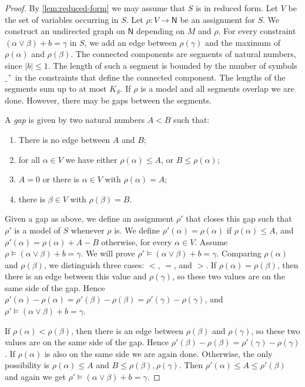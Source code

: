 \documentclass[11pt,a4paper]{article}
\def\NN{\mathsf{N}}
\begin{document}
\begin{proof}
By \cref{lem:reduced-form} we may assume that $S$ is in reduced form.
Let $V$ be the set of variables occurring in $S$.
Let $\rho: V\to\NN$ be an assignment for $S$.
We construct an undirected graph on $\NN$ depending on $M$ and $\rho$.
For every constraint  $(\alpha\vee\beta)+b = \gamma$ in $S$,
we add an edge between $\rho(\gamma)$ and the maximum of $\rho(\alpha)$ and $\rho(\beta)$. 
The connected components are segments of natural numbers, since $|b|\leq 1$.
The length of such a segment is bounded by the number of symbols $\_^+$
in the constraints that define the connected component.
The lengths of the segments sum up to at most $K_{S}$.
If $\rho$ is a model and all segments overlap we are done.
However, there may be gaps between the segments.

A \emph{gap} is given by two natural numbers $A<B$ such that:
\begin{enumerate}
\item There is no edge between $A$ and $B$;
\item for all $\alpha\in V$ we have either $\rho(\alpha)\leq A$, or $B\leq\rho(\alpha)$; 
\item $A=0$ or there is $\alpha\in V$ with $\rho(\alpha)=A$;
\item there is $\beta\in V$ with $\rho(\beta)=B$.
\end{enumerate}

Given a gap as above, we define an assignment $\rho'$ that closes this gap
such that $\rho'$ is a model of $S$ whenever $\rho$ is. We define
$\rho'(\alpha) = \rho(\alpha)$ if $\rho(\alpha)\leq A$,
and $\rho'(\alpha) = \rho(\alpha)+A-B$ otherwise, for every $\alpha\in V$.
Assume $\rho\models (\alpha\vee\beta)+b = \gamma$.
We will prove $\rho'\models (\alpha\vee\beta)+b = \gamma$.
Comparing $\rho(\alpha)$ and $\rho(\beta)$, we distinguish three cases: $<$, $=$, and $>$.
If $\rho(\alpha) = \rho(\beta)$, then there is an edge between this value
and $\rho(\gamma)$, so these two values are on the same side of the gap.
Hence $\rho'(\alpha)-\rho(\alpha)=\rho'(\beta)-\rho(\beta)=\rho'(\gamma)-\rho(\gamma)$,
and $\rho'\models (\alpha\vee\beta)+b = \gamma$.

If $\rho(\alpha) < \rho(\beta)$, then there is an edge between $\rho(\beta)$
and $\rho(\gamma)$, so these two values are on the same side of the gap.
Hence $\rho'(\beta)-\rho(\beta)=\rho'(\gamma)-\rho(\gamma)$.
If $\rho(\alpha)$ is also on the same side we are again done.
Otherwise, the only possibility is $\rho(\alpha)\leq A$ and 
$B\leq\rho(\beta),\rho(\gamma)$. Then $\rho'(\alpha)\leq A\leq \rho'(\beta)$
and again we get $\rho'\models (\alpha\vee\beta)+b = \gamma$.


\end{proof}
\end{document}
